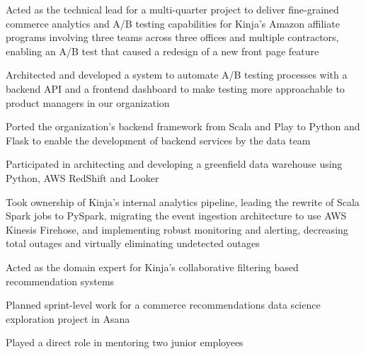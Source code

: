 \begin{job}

  \item Acted as the technical lead for a multi-quarter project to deliver
    fine-grained commerce analytics and A/B testing capabilities for Kinja's
    Amazon affiliate programs involving three teams across three offices and
    multiple contractors, enabling an A/B test that caused a redesign of a new
    front page feature
  \item Architected and developed a system to automate A/B testing processes
    with a backend API and a frontend dashboard to make testing more
    approachable to product managers in our organization
  \item Ported the organization's backend framework from Scala and Play to
    Python and Flask to enable the development of backend services by the data
    team
  \item Participated in architecting and developing a greenfield data warehouse
    using Python, AWS RedShift and Looker
  \item Took ownership of Kinja's internal analytics pipeline, leading the
    rewrite of Scala Spark jobs to PySpark, migrating the event ingestion
    architecture to use AWS Kinesis Firehose, and implementing robust monitoring
    and alerting, decreasing total outages and virtually eliminating undetected
    outages
  \item Acted as the domain expert for Kinja's collaborative filtering based
  recommendation systems
  \item Planned sprint-level work for a commerce recommendations data science
  exploration project in Asana
  \item Played a direct role in mentoring two junior employees
\end{job}
